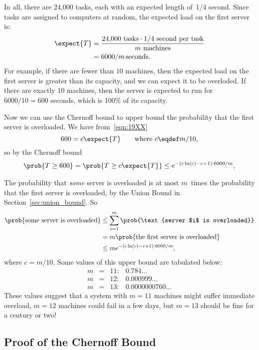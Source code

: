 In all, there are 24,000 tasks, each with an expected length of~1/4
second.  Since tasks are assigned to computers at random, the expected
load on the first server is:
\begin{align}
\expect{T} & = \frac{24{,}000 \mbox{ tasks} \cdot 1/4 \mbox{ second per task}}
  {m \mbox{ machines}} \notag\\
  & = 6000 / m\,\text{seconds}.
\label{eqn:19XX}
\end{align}
For example, if there are fewer than $10$ machines, then the expected
load on the first server is greater than its capacity, and we can
expect it to be overloded.  If there are exactly 10 machines, then the
server is expected to run for $6000/10 = 600$ seconds, which is 100\%
of its capacity.

Now we can use the Chernoff bound to upper bound the probability that
the first server is overloaded.  We have from~\eqref{eqn:19XX}
\[
600 = c \expect{T}  \qquad \text{where } c \eqdef m/10,
\]
so by the Chernoff bound
\begin{align*}
\prob{T \geq 600} = \prob{T \geq c \expect{T}} \leq e^{-(c \ln(c) - c + 1) \cdot 6000 / m},
\end{align*}

The probability that \emph{some} server is overloaded is at most
$m$~times the probability that the first server is overloaded, by the
Union Bound in Section~\ref{sec:union_bound}.  So
\begin{align*}
\prob{\text{some server is overloaded}}
    &\le \sum_{i = 1}^m \prob{\text{server $i$ is overloaded}} \\
    &= m \prob{\text{the first server is overloaded}} \\
    &\leq m e^{-(c \ln(c) - c + 1) \cdot 6000 / m},
\end{align*}
where $c = m/10$.  Some values of this upper bound are tabulated below:
\[
\begin{array}{rcll}
m & = & 11: & 0.784\dots \\
m & = & 12: & 0.000999\dots \\
m & = & 13: & 0.0000000760\dots
\end{array}
\]
These values suggest that a system with $m = 11$ machines might suffer
immediate overload, $m = 12$ machines could fail in a few days, but $m
= 13$ should be fine for a century or two!

\subsection{Proof of the Chernoff Bound}\label{sec:chernoff_proof}

